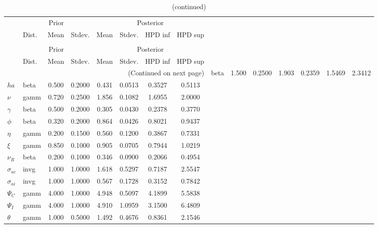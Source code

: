  
\begin{center}
\begin{longtable}{llcccccc} 
\caption{Results from Metropolis-Hastings (parameters)}
 \label{Table:MHPosterior:1}\\
\toprule 
  & \multicolumn{3}{c}{Prior}  &  \multicolumn{4}{c}{Posterior} \\
  \cmidrule(r{.75em}){2-4} \cmidrule(r{.75em}){5-8}
  & Dist. & Mean  & Stdev. & Mean & Stdev. & HPD inf & HPD sup\\
\midrule \endfirsthead 
\caption{(continued)}\\\toprule 
  & \multicolumn{3}{c}{Prior}  &  \multicolumn{4}{c}{Posterior} \\
  \cmidrule(r{.75em}){2-4} \cmidrule(r{.75em}){5-8}
  & Dist. & Mean  & Stdev. & Mean & Stdev. & HPD inf & HPD sup\\
\midrule \endhead 
\bottomrule \multicolumn{8}{r}{(Continued on next page)} \endfoot 
\bottomrule \endlastfoot 
${\sigma}$ & beta &   1.500 & 0.2500 &   1.903& 0.2359 &  1.5469 &  2.3412 \\ 
${ha}$ & beta &   0.500 & 0.2000 &   0.431& 0.0513 &  0.3527 &  0.5113 \\ 
$\nu$ & gamm &   0.720 & 0.2500 &   1.856& 0.1082 &  1.6955 &  2.0000 \\ 
$\gamma$ & beta &   0.500 & 0.2000 &   0.305& 0.0430 &  0.2378 &  0.3770 \\ 
${\phi}$ & beta &   0.320 & 0.2000 &   0.864& 0.0426 &  0.8021 &  0.9437 \\ 
${\eta}$ & gamm &   0.200 & 0.1500 &   0.560& 0.1200 &  0.3867 &  0.7331 \\ 
$\xi$ & gamm &   0.850 & 0.1000 &   0.905& 0.0705 &  0.7944 &  1.0219 \\ 
${\nu_R}$ & beta &   0.200 & 0.1000 &   0.346& 0.0900 &  0.2066 &  0.4954 \\ 
${\sigma_{ac}}$ & invg &   1.000 & 1.0000 &   1.618& 0.5297 &  0.7187 &  2.5547 \\ 
${\sigma_{ai}}$ & invg &   1.000 & 1.0000 &   0.567& 0.1728 &  0.3152 &  0.7842 \\ 
${\Psi_{C}}$ & gamm &   4.000 & 1.0000 &   4.948& 0.5097 &  4.1899 &  5.5838 \\ 
${\Psi_I}$ & gamm &   4.000 & 1.0000 &   4.910& 1.0959 &  3.1500 &  6.4809 \\ 
${\theta}$ & gamm &   1.000 & 0.5000 &   1.492& 0.4676 &  0.8361 &  2.1546 \\ 

\end{longtable}
\end{center}
